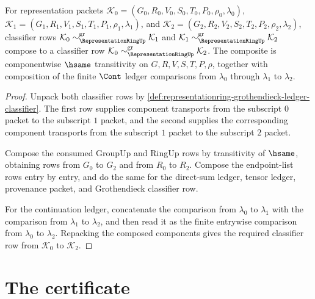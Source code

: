 \begin{theorem}
\label{thm:representationring-grothendieck-classifier-transitive}
For representation packets
$\mathcal{K}_{0}=(G_{0},R_{0},V_{0},S_{0},T_{0},P_{0},\rho_{0},\lambda_{0})$,
$\mathcal{K}_{1}=(G_{1},R_{1},V_{1},S_{1},T_{1},P_{1},\rho_{1},\lambda_{1})$,
and
$\mathcal{K}_{2}=(G_{2},R_{2},V_{2},S_{2},T_{2},P_{2},\rho_{2},\lambda_{2})$,
classifier rows
$\mathcal{K}_{0}\sim_{\RepresentationRingUp}^{\mathrm{gr}}\mathcal{K}_{1}$
and
$\mathcal{K}_{1}\sim_{\RepresentationRingUp}^{\mathrm{gr}}\mathcal{K}_{2}$
compose to a classifier row
$\mathcal{K}_{0}\sim_{\RepresentationRingUp}^{\mathrm{gr}}\mathcal{K}_{2}$.
The composite is componentwise $\hsame$ transitivity on
$G,R,V,S,T,P,\rho$, together with composition of the finite $\Cont$ ledger
comparisons from $\lambda_{0}$ through $\lambda_{1}$ to $\lambda_{2}$.
\end{theorem}
\begin{proof}
Unpack both classifier rows by
\autoref{def:representationring-grothendieck-ledger-classifier}. The first
row supplies component transports from the subscript $0$ packet to the
subscript $1$ packet, and the second supplies the corresponding component
transports from the subscript $1$ packet to the subscript $2$ packet.

Compose the consumed GroupUp and RingUp rows by transitivity of $\hsame$,
obtaining rows from $G_{0}$ to $G_{2}$ and from $R_{0}$ to $R_{2}$. Compose
the endpoint-list rows entry by entry, and do the same for the direct-sum
ledger, tensor ledger, provenance packet, and Grothendieck classifier row.

For the continuation ledger, concatenate the comparison from $\lambda_{0}$ to
$\lambda_{1}$ with the comparison from $\lambda_{1}$ to $\lambda_{2}$, and
then read it as the finite entrywise comparison from $\lambda_{0}$ to
$\lambda_{2}$. Repacking the composed components gives the required
classifier row from $\mathcal{K}_{0}$ to $\mathcal{K}_{2}$.
\end{proof}

\section{The certificate}
\label{sec:representationring-certificate}

